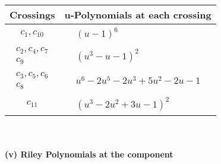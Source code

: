 \documentclass[1p]{elsarticle_modified}
\theoremstyle{definition}
\begin{document}
\begin{tabular}{m{50pt}|m{274pt}}
Crossings & \hspace{64pt}u-Polynomials at each crossing \\
\hline $$\begin{aligned}c_{1},c_{10}\end{aligned}$$&$\begin{aligned}
&(u-1)^6
\end{aligned}$\\
\hline $$\begin{aligned}c_{2},c_{4},c_{7}\\c_{9}\end{aligned}$$&$\begin{aligned}
&(u^3- u-1)^2
\end{aligned}$\\
\hline $$\begin{aligned}c_{3},c_{5},c_{6}\\c_{8}\end{aligned}$$&$\begin{aligned}
&u^6-2 u^5-2 u^3+5 u^2-2 u-1
\end{aligned}$\\
\hline $$\begin{aligned}c_{11}\end{aligned}$$&$\begin{aligned}
&(u^3-2 u^2+3 u-1)^2
\end{aligned}$\\
\hline
\end{tabular}\\~\\
\newpage\renewcommand{\arraystretch}{1}
\flushleft \textbf{(v) Riley Polynomials at the component}\newline \\
\end{document}
